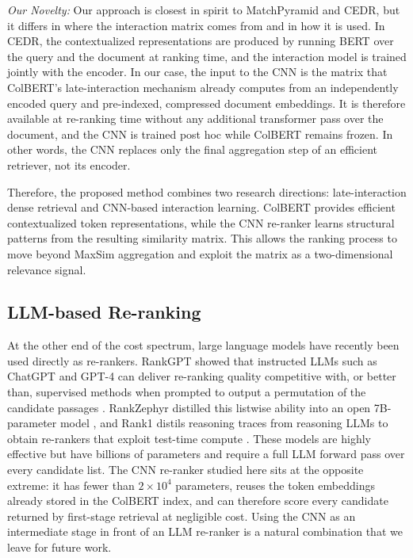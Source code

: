 \documentclass[preprint,5p,times,twocolumn,authoryear]{elsarticle}
\begin{document}
\textit{Our Novelty:} Our approach is closest in spirit to MatchPyramid and CEDR, but it differs in where the interaction matrix comes from and in how it is used. In CEDR, the contextualized representations are produced by running BERT over the query and the document at ranking time, and the interaction model is trained jointly with the encoder. In our case, the input to the CNN is the matrix that ColBERT's late-interaction mechanism already computes from an independently encoded query and pre-indexed, compressed document embeddings. It is therefore available at re-ranking time without any additional transformer pass over the document, and the CNN is trained post hoc while ColBERT remains frozen. In other words, the CNN replaces only the final aggregation step of an efficient retriever, not its encoder.

Therefore, the proposed method combines two research directions: late-interaction dense retrieval and CNN-based interaction learning. ColBERT provides efficient contextualized token representations, while the CNN re-ranker learns structural patterns from the resulting similarity matrix. This allows the ranking process to move beyond MaxSim aggregation and exploit the matrix as a two-dimensional relevance signal.

\subsection{LLM-based Re-ranking}

At the other end of the cost spectrum, large language models have recently been used directly as re-rankers. RankGPT showed that instructed LLMs such as ChatGPT and GPT-4 can deliver re-ranking quality competitive with, or better than, supervised methods when prompted to output a permutation of the candidate passages \citep{sun2023rankgpt}. RankZephyr distilled this listwise ability into an open 7B-parameter model \citep{pradeep2023rankzephyr}, and Rank1 distils reasoning traces from reasoning LLMs to obtain re-rankers that exploit test-time compute \citep{weller2025rank1}. These models are highly effective but have billions of parameters and require a full LLM forward pass over every candidate list. The CNN re-ranker studied here sits at the opposite extreme: it has fewer than $2\times10^{4}$ parameters, reuses the token embeddings already stored in the ColBERT index, and can therefore score every candidate returned by first-stage retrieval at negligible cost. Using the CNN as an intermediate stage in front of an LLM re-ranker is a natural combination that we leave for future work.
\end{document}
